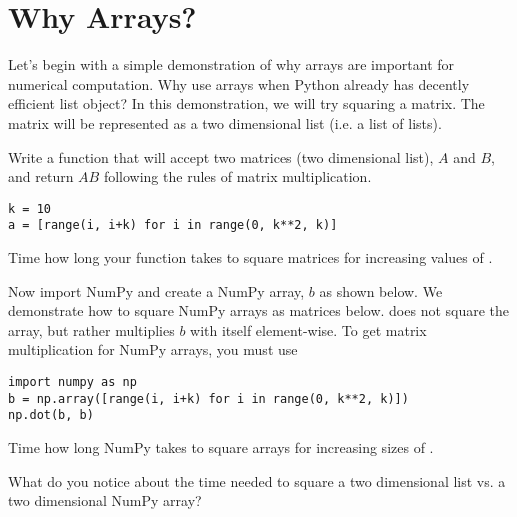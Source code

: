 \label{lab:Essentials_NumPy}

\section*{Why Arrays?}
\begin{problem}
Let's begin with a simple demonstration of why arrays are important for numerical computation.  Why use arrays when Python already has decently efficient list object?  In this demonstration, we will try squaring a matrix.  The matrix will be represented as a two dimensional list (i.e. a list of lists).

Write a function that will accept two matrices (two dimensional list), $A$ and $B$, and return $AB$ following the rules of matrix multiplication.
\begin{lstlisting}
k = 10
a = [range(i, i+k) for i in range(0, k**2, k)]
\end{lstlisting}
Time how long your function takes to square matrices for increasing values of .

Now import NumPy and create a NumPy array, $b$ as shown below.  We demonstrate how to square NumPy arrays as matrices below.   does not square the array, but rather multiplies $b$ with itself element-wise.  To get matrix multiplication for NumPy arrays, you must use 
\begin{lstlisting}
import numpy as np
b = np.array([range(i, i+k) for i in range(0, k**2, k)])
np.dot(b, b)
\end{lstlisting}
Time how long NumPy takes to square arrays for increasing sizes of .

What do you notice about the time needed to square a two dimensional list vs. a two dimensional NumPy array?

% 
\end{problem}


